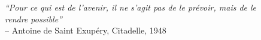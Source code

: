 
\thispagestyle{empty}

\begin{figure}[p!]
\hfill \begin{minipage}[c]{.7\textwidth}
\begin{flushright}
\textit{``Pour ce qui est de l’avenir, il ne s’agit pas de le prévoir, mais de le rendre possible''}
\\[1em]
-- Antoine de Saint Exupéry, Citadelle, 1948
\end{flushright}
\end{minipage}
\end{figure}

\clearpage